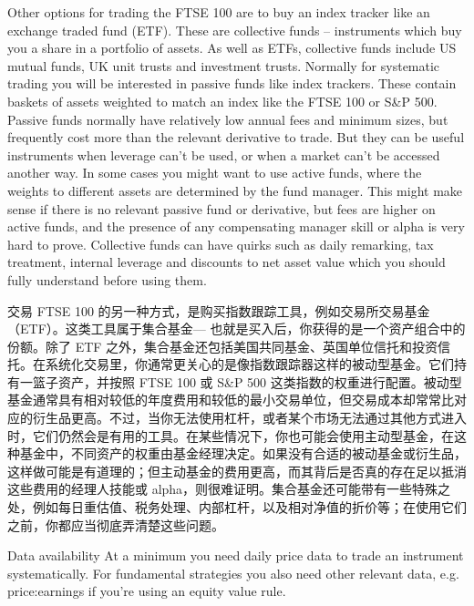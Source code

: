 \begin{englishblock} Other options for trading the FTSE 100 are to buy an index tracker like an exchange traded fund (ETF). These are collective funds -- instruments which buy you a share in a portfolio of assets. As well as ETFs, collective funds include US mutual funds, UK unit trusts and investment trusts. Normally for systematic trading you will be interested in passive funds like index trackers. These contain baskets of assets weighted to match an index like the FTSE 100 or S\&P 500. Passive funds normally have relatively low annual fees and minimum sizes, but frequently cost more than the relevant derivative to trade. But they can be useful instruments when leverage can't be used, or when a market can't be accessed another way. In some cases you might want to use active funds, where the weights to different assets are determined by the fund manager. This might make sense if there is no relevant passive fund or derivative, but fees are higher on active funds, and the presence of any compensating manager skill or alpha is very hard to prove. Collective funds can have quirks such as daily remarking, tax treatment, internal leverage and discounts to net asset value which you should fully understand before using them. \end{englishblock}

\begin{chineseblock}交易 FTSE 100 的另一种方式，是购买指数跟踪工具，例如交易所交易基金（ETF）。这类工具属于集合基金--- 也就是买入后，你获得的是一个资产组合中的份额。除了 ETF 之外，集合基金还包括美国共同基金、英国单位信托和投资信托。在系统化交易里，你通常更关心的是像指数跟踪器这样的被动型基金。它们持有一篮子资产，并按照 FTSE 100 或 S\&P 500 这类指数的权重进行配置。被动型基金通常具有相对较低的年度费用和较低的最小交易单位，但交易成本却常常比对应的衍生品更高。不过，当你无法使用杠杆，或者某个市场无法通过其他方式进入时，它们仍然会是有用的工具。在某些情况下，你也可能会使用主动型基金，在这种基金中，不同资产的权重由基金经理决定。如果没有合适的被动基金或衍生品，这样做可能是有道理的；但主动基金的费用更高，而其背后是否真的存在足以抵消这些费用的经理人技能或 alpha，则很难证明。集合基金还可能带有一些特殊之处，例如每日重估值、税务处理、内部杠杆，以及相对净值的折价等；在使用它们之前，你都应当彻底弄清楚这些问题。\end{chineseblock}


\begin{englishblock} Data availability At a minimum you need daily price data to trade an instrument systematically. For fundamental strategies you also need other relevant data, e.g. price:earnings if you're using an equity value rule. \end{englishblock}

